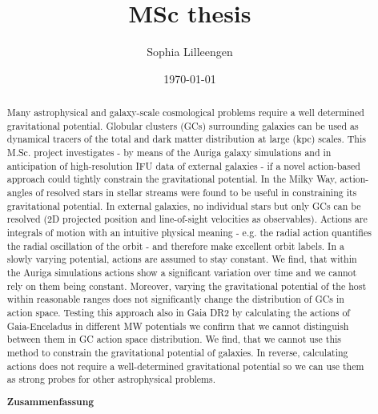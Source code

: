 \documentclass[a4paper,12pt,abstracton, twoside]{scrartcl}
\title{MSc thesis}
\author{Sophia Lilleengen}
\date{\today}
\begin{document}
 

\onehalfspacing

\titlepage
\begin{abstract}
\hspace{-12pt}Many astrophysical and galaxy-scale cosmological problems require a well determined gravitational potential. Globular clusters (GCs) surrounding galaxies can be used as dynamical tracers of the total and dark matter distribution at large (kpc) scales. This M.Sc. project investigates - by means of the Auriga galaxy simulations and in anticipation of high-resolution IFU data of external galaxies - if a novel action-based approach could tightly constrain the gravitational potential. In the Milky Way, action-angles of resolved stars in stellar streams were found to be useful in constraining its gravitational potential. In external galaxies, no individual stars but only GCs can be resolved (2D projected position and line-of-sight velocities as observables). Actions are integrals of motion with an intuitive physical meaning - e.g. the radial action quantifies the radial oscillation of the orbit - and therefore make excellent orbit labels. In a slowly varying potential, actions are assumed to stay constant. We find, that within the Auriga simulations actions show a significant variation over time and we cannot rely on them being constant. Moreover, varying the gravitational potential of the host within reasonable ranges does not significantly change the distribution of GCs in action space. Testing this approach also in Gaia DR2 by calculating the actions of Gaia-Enceladus in different MW potentials we confirm that we cannot distinguish between them in GC action space distribution. We find, that we cannot use this method to constrain the gravitational potential of galaxies. In reverse, calculating actions does not require a well-determined gravitational potential so we can use them as strong probes for other astrophysical problems. 

\begin{center}
 \textbf{Zusammenfassung}\end{center}

\hspace{-12pt}\blindtext

\end{abstract}

\newpage
{}
\tableofcontents

\newpage
{}
\end{document}
